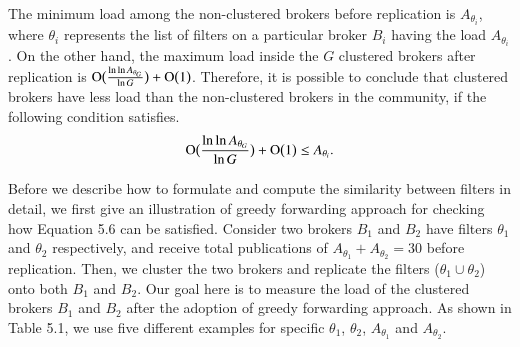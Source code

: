 The minimum load among the non-clustered brokers before replication is $A_{\theta_i}$, where $\theta_i$ represents the list of filters on a particular broker $B_i$ having the load $A_{\theta_i}$. On the other hand, the maximum load inside the $G$ clustered brokers after replication is $\operatorname{O}\bigl(\frac{\ln\ln A_{\theta_G}}{\ln G}\bigr) + \operatorname{O}\bigl(1\bigr)$. Therefore, it is possible to conclude that clustered brokers have less load than the non-clustered brokers in the community, if the following condition satisfies.
\begin{equation}
\operatorname{O}\bigl(\frac{\ln\ln A_{\theta_G}}{\ln G}\bigr) + \operatorname{O}\bigl(1\bigr) \leq A_{\theta_i}.
\end{equation}

Before we describe how to formulate and compute the similarity between filters in detail, we first give an illustration of greedy forwarding approach for checking how Equation 5.6 can be satisfied. Consider two brokers $B_1$ and $B_2$ have filters $\theta_1$ and $\theta_2$ respectively, and receive total publications of $A_{\theta_1} + A_{\theta_2} = 30$ before replication. Then, we cluster the two brokers and replicate the filters ($\theta_1 \cup \theta_2$) onto both $B_1$ and $B_2$. Our goal here is to measure the load of the clustered brokers $B_1$ and $B_2$ after the adoption of greedy forwarding approach. As shown in Table 5.1, we use five different examples for specific $\theta_1$, $\theta_2$, $A_{\theta_1}$ and $A_{\theta_2}$.

